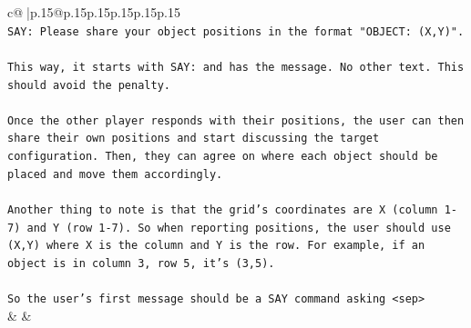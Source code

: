 \documentclass{article}
\begin{document}
{\begin{supertabular}{c@{$\;$}|p{.15\linewidth}@{}p{.15\linewidth}p{.15\linewidth}p{.15\linewidth}p{.15\linewidth}p{.15\linewidth}}
{{{\\ 
\texttt{SAY: Please share your object positions in the format "OBJECT: (X,Y)".} \\
\\ 
\texttt{This way, it starts with SAY: and has the message. No other text. This should avoid the penalty.} \\
\\ 
\texttt{Once the other player responds with their positions, the user can then share their own positions and start discussing the target configuration. Then, they can agree on where each object should be placed and move them accordingly.} \\
\\ 
\texttt{Another thing to note is that the grid's coordinates are X (column 1{-}7) and Y (row 1{-}7). So when reporting positions, the user should use (X,Y) where X is the column and Y is the row. For example, if an object is in column 3, row 5, it's (3,5).} \\
\\ 
\texttt{So the user's first message should be a SAY command asking <sep>} \\
            }
        }
    }
    & & \\ \\


\end{supertabular}}
\end{document}
